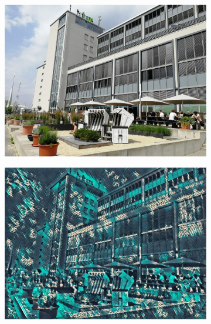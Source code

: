 \begin{frame}
\begin{figure}[H]
        \begin{subfigure}[h]{0.32\textwidth}
            \centering
            \includegraphics[width=\textwidth]{resources/content/content/htw.jpg}
        \end{subfigure}
        \begin{subfigure}[h]{0.32\textwidth}
            \centering
            \includegraphics[width=\textwidth]{resources/content/experiments/htw-vgg16_teal_and_black_abstract_painting.jpg}
        \end{subfigure}
        \begin{subfigure}[h]{0.32\textwidth}
            \centering

\end{subfigure}
\end{figure}
\end{frame}
